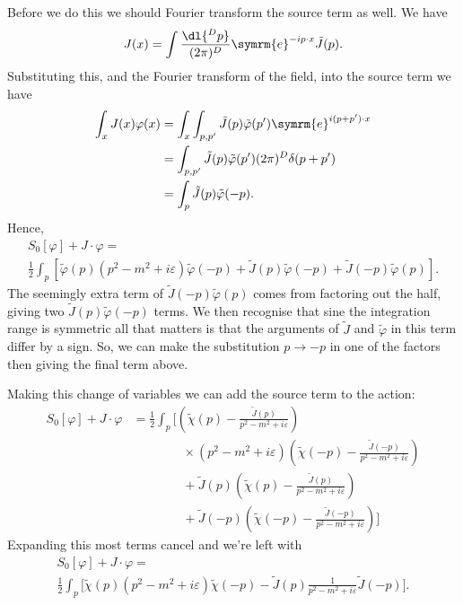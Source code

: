 \documentclass[fleqn]{NotesClass}
\newcommand{\e}{\symrm{e}}
\begin{document}
    Before we do this we should Fourier transform the source term as well.
    We have
    \begin{equation}
        J(x) = \int \frac{\dl{^Dp}}{(2\pi)^D} \e^{-ip\cdot x} \tilde{J}(p).
    \end{equation}
    Substituting this, and the Fourier transform of the field, into the source term we have
    \begin{align}
        \int_x J(x)\varphi(x) &= \int_x \int_{p,p'} \tilde{J}(p)\tilde{\varphi}(p') \e^{i(p + p') \cdot x}\\
        &= \int_{p,p'} \tilde{J}(p)\tilde{\varphi}(p') (2\pi)^D\delta(p + p')\\
        &= \int_p \tilde{J}(p) \tilde{\varphi}(-p).
    \end{align}
    Hence,
    \begin{multline}
        S_0[\varphi] + J \cdot \varphi =\\
        \frac{1}{2}\int_p \left[ \tilde{\varphi}(p) (p^2 - m^2 + i\varepsilon) \tilde{\varphi}(-p) + \tilde{J}(p)\tilde{\varphi}(-p) + \tilde{J}(-p)\tilde{\varphi}(p) \right].
    \end{multline}
    The seemingly extra term of \(\tilde{J}(-p) \tilde{\varphi}(p)\) comes from factoring out the half, giving two \(\tilde{J}(p)\tilde{\varphi}(-p)\) terms. 
    We then recognise that sine the integration range is symmetric all that matters is that the arguments of \(\tilde{J}\) and \(\tilde{\varphi}\) in this term differ by a sign.
    So, we can make the substitution \(p \to -p\) in one of the factors then giving the final term above.
    
    Making this change of variables we can add the source term to the action:
    \begin{align}
        S_0[\varphi] + J \cdot \varphi &= \frac{1}{2}\int_p \Bigg[ \left( \tilde{\chi}(p) - \frac{\tilde{J}(p)}{p^2 - m^2 + i\varepsilon} \right)\\
        &\qquad\qquad\times (p^2 - m^2 + i\varepsilon) \left( \tilde{\chi}(-p) - \frac{\tilde{J}(-p)}{p^2 - m^2 + i\varepsilon} \right)\\
        &\qquad\qquad+ \tilde{J}(p)\left( \tilde{\chi}(p) - \frac{\tilde{J}(p)}{p^2 - m^2 + i\varepsilon} \right)\\
        &\qquad\qquad+ \tilde{J}(-p)\left( \tilde{\chi}(-p) - \frac{\tilde{J}(-p)}{p^2 - m^2 + i\varepsilon} \right) \Bigg]
    \end{align}
    Expanding this most terms cancel and we're left with
    \begin{multline}
        S_0[\varphi] + J \cdot \varphi =\\
        \frac{1}{2} \int_p \bigg[ \tilde{\chi}(p)(p^2 - m^2 + i\varepsilon)\tilde{\chi}(-p) - \tilde{J}(p) \frac{1}{p^2 - m^2 + i\varepsilon} \tilde{J}(-p)  \bigg].
    \end{multline}
    
\end{document}
